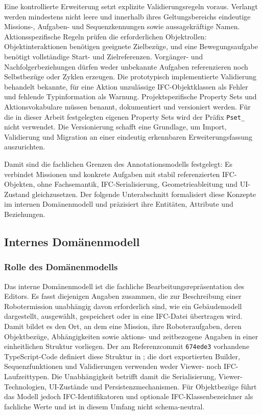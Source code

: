 Eine kontrollierte Erweiterung setzt explizite Validierungsregeln voraus. Verlangt werden mindestens nicht leere und
innerhalb ihres Geltungsbereichs eindeutige Missions-, Aufgaben- und Sequenzkennungen sowie aussagekräftige Namen.
Aktionsspezifische Regeln prüfen die erforderlichen Objektrollen: Objektinteraktionen benötigen geeignete Zielbezüge,
und eine Bewegungsaufgabe benötigt vollständige Start- und Zielreferenzen. Vorgänger- und Nachfolgerbeziehungen dürfen
weder unbekannte Aufgaben referenzieren noch Selbstbezüge oder Zyklen erzeugen. Die prototypisch implementierte
Validierung behandelt bekannte, für eine Aktion unzulässige IFC-Objektklassen als Fehler und fehlende Typinformation als
Warnung. Projektspezifische Property Sets und Aktionsvokabulare müssen benannt, dokumentiert und versioniert werden. Für
die in dieser Arbeit festgelegten eigenen Property Sets wird der Präfix \texttt{Pset\_} nicht verwendet. Die
Versionierung schafft eine Grundlage, um Import, Validierung und Migration an einer eindeutig erkennbaren
Erweiterungsfassung auszurichten.

Damit sind die fachlichen Grenzen des Annotationsmodells festgelegt: Es verbindet Missionen und konkrete Aufgaben mit
stabil referenzierten IFC-Objekten, ohne Fachsemantik, IFC-Serialisierung, Geometrieableitung und UI-Zustand
gleichzusetzen. Der folgende Unterabschnitt formalisiert diese Konzepte im internen Domänenmodell und präzisiert ihre
Entitäten, Attribute und Beziehungen.
\subsection{Internes Domänenmodell}\label{sec:internes-domaenenmodell}

\subsubsection{Rolle des Domänenmodells}

Das interne Domänenmodell ist die fachliche Bearbeitungsrepräsentation des Editors. Es fasst diejenigen Angaben
zusammen, die zur Beschreibung einer Robotermission unabhängig davon erforderlich sind, wie ein Gebäudemodell
dargestellt, ausgewählt, gespeichert oder in eine IFC-Datei übertragen wird. Damit bildet es den Ort, an dem eine
Mission, ihre Roboteraufgaben, deren Objektbezüge, Abhängigkeiten sowie aktions- und zeitbezogene Angaben in einer
einheitlichen Struktur vorliegen. Der am Referenzcommit \texttt{674ede3} vorhandene TypeScript-Code definiert diese
Struktur in ; die dort exportierten Builder, Sequenzfunktionen und Validierungen verwenden
weder Viewer- noch IFC-Laufzeittypen. Die Unabhängigkeit betrifft damit die Serialisierung, Viewer-Technologien,
UI-Zustände und Persistenzmechanismen. Für Objektbezüge führt das Modell jedoch IFC-Identifikatoren und optionale
IFC-Klassenbezeichner als fachliche Werte und ist in diesem Umfang nicht schema-neutral.

